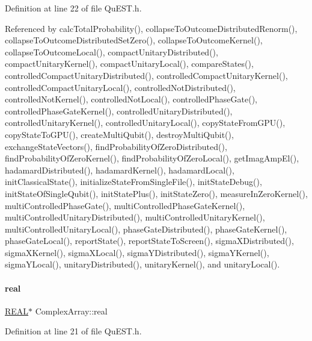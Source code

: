 Definition at line 22 of file Qu\+E\+S\+T.\+h.



Referenced by calc\+Total\+Probability(), collapse\+To\+Outcome\+Distributed\+Renorm(), collapse\+To\+Outcome\+Distributed\+Set\+Zero(), collapse\+To\+Outcome\+Kernel(), collapse\+To\+Outcome\+Local(), compact\+Unitary\+Distributed(), compact\+Unitary\+Kernel(), compact\+Unitary\+Local(), compare\+States(), controlled\+Compact\+Unitary\+Distributed(), controlled\+Compact\+Unitary\+Kernel(), controlled\+Compact\+Unitary\+Local(), controlled\+Not\+Distributed(), controlled\+Not\+Kernel(), controlled\+Not\+Local(), controlled\+Phase\+Gate(), controlled\+Phase\+Gate\+Kernel(), controlled\+Unitary\+Distributed(), controlled\+Unitary\+Kernel(), controlled\+Unitary\+Local(), copy\+State\+From\+G\+P\+U(), copy\+State\+To\+G\+P\+U(), create\+Multi\+Qubit(), destroy\+Multi\+Qubit(), exchange\+State\+Vectors(), find\+Probability\+Of\+Zero\+Distributed(), find\+Probability\+Of\+Zero\+Kernel(), find\+Probability\+Of\+Zero\+Local(), get\+Imag\+Amp\+El(), hadamard\+Distributed(), hadamard\+Kernel(), hadamard\+Local(), init\+Classical\+State(), initialize\+State\+From\+Single\+File(), init\+State\+Debug(), init\+State\+Of\+Single\+Qubit(), init\+State\+Plus(), init\+State\+Zero(), measure\+In\+Zero\+Kernel(), multi\+Controlled\+Phase\+Gate(), multi\+Controlled\+Phase\+Gate\+Kernel(), multi\+Controlled\+Unitary\+Distributed(), multi\+Controlled\+Unitary\+Kernel(), multi\+Controlled\+Unitary\+Local(), phase\+Gate\+Distributed(), phase\+Gate\+Kernel(), phase\+Gate\+Local(), report\+State(), report\+State\+To\+Screen(), sigma\+X\+Distributed(), sigma\+X\+Kernel(), sigma\+X\+Local(), sigma\+Y\+Distributed(), sigma\+Y\+Kernel(), sigma\+Y\+Local(), unitary\+Distributed(), unitary\+Kernel(), and unitary\+Local().

\mbox{\label{structComplexArray_a4195cac6c784ea1b6271f1c7dba1548a}} 
\paragraph{\texorpdfstring{real}{real}}
{\footnotesize\ttfamily \mbox{\hyperlink{QuEST__precision_8h_a4b654506f18b8bfd61ad2a29a7e38c25}{R\+E\+AL}}$\ast$ Complex\+Array\+::real}



Definition at line 21 of file Qu\+E\+S\+T.\+h.



